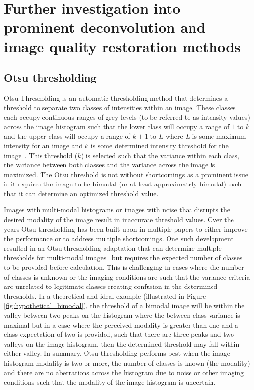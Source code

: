 \section{Further investigation into prominent deconvolution and image quality restoration methods}\label{sec:further_methods}
\subsection{Otsu thresholding}
Otsu Thresholding is an automatic thresholding method that determines a threshold to separate two classes of intensities within an image. These classes each occupy continuous ranges of grey levels (to be referred to as intensity values) across the image histogram such that the lower class will occupy a range of $1$ to $k$ and the upper class will occupy a range of $k+1$ to $L$ where $L$ is some maximum intensity for an image and $k$ is some determined intensity threshold for the image~\cite{Otsu1979ATS}. This threshold ($k$) is selected such that the variance within each class, the variance between both classes and the variance across the image is maximized. The Otsu threshold is not without shortcomings as a prominent issue is it requires the image to be bimodal (or at least approximately bimodal) such that it can determine an optimized threshold value.\par Images with multi-modal histograms or images with noise that disrupts the desired modality of the image result in inaccurate threshold values. Over the years Otsu thresholding has been built upon in multiple papers to either improve the performance or to address multiple shortcomings. One such development resulted in an Otsu thresholding adaptation that can determine multiple thresholds for multi-modal images~\cite{MultiOtsu} but requires the expected number of classes to be provided before calculation. This is challenging in cases where the number of classes is unknown or the imaging conditions are such that the variance criteria are unrelated to legitimate classes creating confusion in the determined thresholds. In a theoretical and ideal example (illustrated in Figure \ref{fig:hypothetical_bimodal}), the threshold of a bimodal image will be within the valley between two peaks on the histogram where the between-class variance is maximal but in a case where the perceived modality is greater than one and a class expectation of two is provided, such that there are three peaks and two valleys on the image histogram, then the determined threshold may fall within either valley. In summary, Otsu thresholding performs best when the image histogram modality is two or more, the number of classes is known (the modality) and there are no aberrations across the histogram due to noise or other imaging conditions such that the modality of the image histogram is uncertain.

